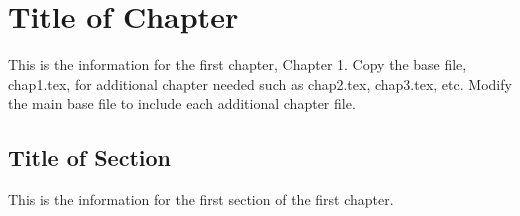 %
%
\chapter{Title of Chapter}
This is the information for the first chapter, Chapter 1.  Copy the base file, chap1.tex, for additional chapter needed such as chap2.tex, chap3.tex, etc. Modify the main base file to include each additional chapter file.

\section{Title of Section}

This is the information for the first section of the first chapter.